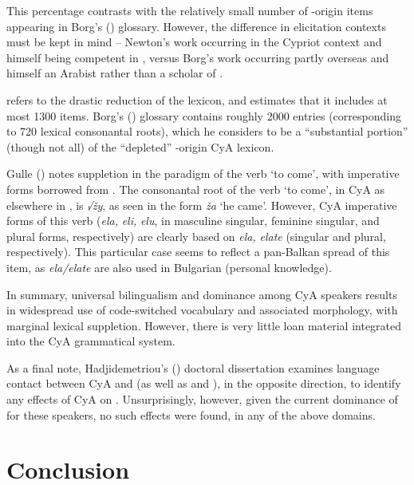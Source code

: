 \documentclass[output=paper]{langsci/langscibook}
\begin{document}
This percentage contrasts with the relatively small number of -origin items appearing in Borg's (\citeyear{Borg2004}) glossary. However, the difference in elicitation contexts must be kept in mind – Newton’s work occurring in the Cypriot context and himself being competent in , versus Borg’s work occurring partly overseas and himself an Arabist rather than a scholar of .

\citet{Roth2004} refers to the drastic reduction of the lexicon, and estimates that it includes at most 1300 items. Borg's (\citeyear{Borg2004}) glossary contains roughly 2000 entries (corresponding to 720 lexical consonantal {roots}), which he considers to be a “substantial portion” (though not all) of the “depleted” -origin CyA lexicon.

Gulle (\citeyear[45]{Gulle2016}) notes suppletion in the paradigm of the verb ‘to come’, with imperative forms borrowed from . The consonantal {root} of the verb ‘to come’, in CyA as elsewhere in , is \textit{√žy}, as seen in the form \textit{ža} ‘he came’. However, CyA imperative forms of this verb (\textit{ela,} \textit{eli,} \textit{elu}, in masculine singular, feminine singular, and plural forms, respectively) are clearly based on  \textit{ela,} \textit{elate} (singular and plural, respectively). This particular case seems to reflect a pan-Balkan spread of this item, as \textit{ela/elate} are also used in Bulgarian (personal knowledge).

In summary, universal {bilingualism} and  dominance among CyA speakers results in widespread use of code-switched  vocabulary and associated morphology, with marginal lexical suppletion. However, there is very little loan material integrated into the CyA grammatical system.

As a final note, Hadjidemetriou's (\citeyear{Hadjidemetriou2009}) doctoral dissertation examines language contact between CyA and  (as well as  and ), in the opposite direction, to identify any effects of CyA on . Unsurprisingly, however, given the current dominance of  for these speakers, no such effects were found, in any of the above domains.

\section{Conclusion}
\end{document}
